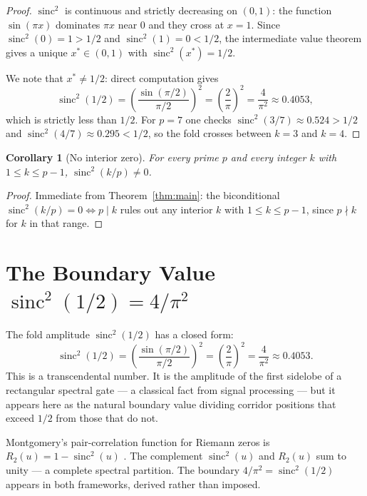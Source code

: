 \documentclass[11pt,reqno]{amsart}
\theoremstyle{plain}
\newtheorem{corollary}[theorem]{Corollary}
\theoremstyle{remark}
\DeclareMathOperator{\sinc}{sinc}
\begin{document}
\begin{proof}
$\sinc^2$ is continuous and strictly decreasing on $(0,1)$: the
function $\sin(\pi x)$ dominates $\pi x$ near $0$ and they cross at
$x=1$. Since $\sinc^2(0)=1>1/2$ and $\sinc^2(1)=0<1/2$, the
intermediate value theorem gives a unique $x^{*}\in(0,1)$ with
$\sinc^2(x^{*})=1/2$.

We note that $x^{*}\neq 1/2$: direct computation gives
\[
  \sinc^2(1/2)
    =\left(\frac{\sin(\pi/2)}{\pi/2}\right)^{\!2}
    =\left(\frac{2}{\pi}\right)^{\!2}
    =\frac{4}{\pi^2}\approx 0.4053,
\]
which is strictly less than $1/2$. For $p=7$ one checks
$\sinc^2(3/7)\approx 0.524>1/2$ and
$\sinc^2(4/7)\approx 0.295<1/2$, so the fold crosses between
$k=3$ and $k=4$.
\end{proof}

\begin{corollary}[No interior zero]\label{cor:noshortcut}
For every prime $p$ and every integer $k$ with $1\le k\le p-1$,
$\sinc^2(k/p)\neq 0$.
\end{corollary}

\begin{proof}
Immediate from Theorem~\ref{thm:main}: the biconditional
$\sinc^2(k/p)=0\iff p\mid k$ rules out any interior $k$ with
$1\le k\le p-1$, since $p\nmid k$ for $k$ in that range.
\end{proof}

\section{The Boundary Value \texorpdfstring{$\sinc^2(1/2)=4/\pi^2$}{sinc\^{}2(1/2) = 4/pi\^{}2}}\label{sec:boundary}

The fold amplitude $\sinc^2(1/2)$ has a closed form:
\begin{equation}\label{eq:fourpi2}
  \sinc^2(1/2)
    =\left(\frac{\sin(\pi/2)}{\pi/2}\right)^{\!2}
    =\left(\frac{2}{\pi}\right)^{\!2}
    =\frac{4}{\pi^2}\approx 0.4053.
\end{equation}
This is a transcendental number. It is the amplitude of the first
sidelobe of a rectangular spectral gate --- a classical fact from
signal processing --- but it appears here as the natural boundary
value dividing corridor positions that exceed $1/2$ from those that
do not.

Montgomery's pair-correlation function for Riemann zeros is
$R_2(u)=1-\sinc^2(u)$ \cite{Montgomery1973}. The complement
$\sinc^2(u)$ and $R_2(u)$ sum to unity --- a complete spectral
partition. The boundary $4/\pi^2=\sinc^2(1/2)$ appears in both
frameworks, derived rather than imposed.
\end{document}
